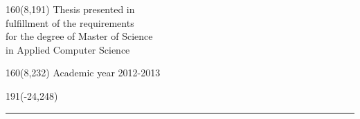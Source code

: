 \documentclass[12pt,a4paper,oneside]{book}
\begin{document}
%
\begin{textblock}{160}(8,191)
\textblockcolour{}
\vspace{-\parskip}
\flushright
Thesis presented in\\[4.5pt]
fulfillment of the requirements\\[4.5pt]
for the degree of Master of Science\\[4.5pt]
in Applied Computer Science\\
\end{textblock}
%
\begin{textblock}{160}(8,232)
\textblockcolour{}
\vspace{-\parskip}
\flushright
Academic year 2012-2013
\end{textblock}
%
\begin{textblock}{191}(-24,248)
{\color{blueline}\rule{550pt}{5.5pt}}
\end{textblock}
%
\vfill
\newpage

\rmfamily
\setcounter{page}{0}

\newpage
\tableofcontents

\newpage
\setcounter{page}{0}









% 



\end{document}
